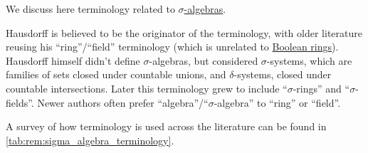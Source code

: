 \begin{remark}\label{rem:sigma_algebra_terminology}
  We discuss here terminology related to \hyperref[def:sigma_algebra]{\( \sigma \)-algebras}.

  Hausdorff is believed to be the originator of the terminology, with older literature reusing his \enquote{ring}/\enquote{field} terminology (which is unrelated to \hyperref[def:boolean_ring]{Boolean rings}). Hausdorff himself didn't define \( \sigma \)-algebras, but considered \( \sigma \)-systems, which are families of sets closed under countable unions, and \( \delta \)-systems, closed under countable intersections. Later this terminology grew to include \enquote{\( \sigma \)-rings} and \enquote{\( \sigma \)-fields}. Newer authors often prefer \enquote{algebra}/\enquote{\( \sigma \)-algebra} to \enquote{ring} or \enquote{field}.

  A survey of how terminology is used across the literature can be found in \cref{tab:rem:sigma_algebra_terminology}.


\end{remark}
